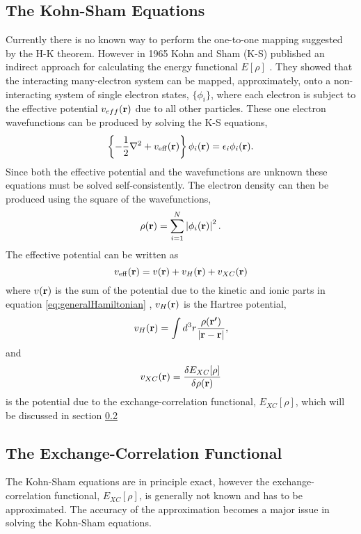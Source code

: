\subsection{The Kohn-Sham Equations}
Currently there is no known way to perform the one-to-one mapping suggested by the H-K theorem. However in 1965 Kohn and Sham (K-S) published an indirect approach for calculating the energy functional $E[\rho]$ \cite{kohn1965}.
They showed that the interacting many-electron system can be mapped, approximately, onto a non-interacting system of single electron states, $\{\phi_i\}$, where each electron is subject to the effective potential $v_{eff}({\mathrm{\mathbf{\bm{r}}}})$ due to all other particles. These one electron wavefunctions can be produced by solving the K-S equations,
\begin{equation}
\label{eq:K-Sequation}
 \left\{-\frac{1}{2} \nabla ^2 + v_\mathrm{eff}({\mathrm{\mathbf{\bm{r}}}}) \right\} \phi_i({\mathrm{\mathbf{\bm{r}}}}) = \epsilon_i \phi_i({\mathrm{\mathbf{\bm{r}}}}).
\end{equation}
Since both the effective potential and the wavefunctions are unknown these equations must be solved self-consistently.
The electron density can then be produced using the square of the wavefunctions,
\begin{equation}
\label{eq:electronDensity}
 \rho({\mathrm{\mathbf{\bm{r}}}}) = \sum_{i=1}^N \left| \phi_i({\mathrm{\mathbf{\bm{r}}}}) \right|^2.
\end{equation}
The effective potential can be written as
\begin{equation}
\label{eq:effectivePotential}
 v_\mathrm{eff}({\mathrm{\mathbf{\bm{r}}}}) = v({\mathrm{\mathbf{\bm{r}}}}) + v_{H}({\mathrm{\mathbf{\bm{r}}}}) + v_{XC}({\mathrm{\mathbf{\bm{r}}}})
\end{equation}
where $v({\mathrm{\mathbf{\bm{r}}}})$ is the sum of the potential due to the kinetic and ionic parts in equation \ref{eq:generalHamiltonian}%
, $v_{H}({\mathrm{\mathbf{\bm{r}}}})$ is the Hartree potential,
\begin{equation}
\label{eq:hartreePotential}
 v_{H}({\mathrm{\mathbf{\bm{r}}}}) = \int d^3r \frac{\rho({\mathrm{\mathbf{\bm{r'}}}})}{\left| {\mathrm{\mathbf{\bm{r}}}} - {\mathrm{\mathbf{\bm{r}}}} \right|},
\end{equation}
and
\begin{equation}
\label{eq:XCpotential}
 v_{XC}({\mathrm{\mathbf{\bm{r}}}}) = \frac{\delta E_{XC}[\rho]}{\delta \rho({\mathrm{\mathbf{\bm{r}}}})}
\end{equation}
is the potential due to the exchange-correlation functional, $E_{XC}[\rho]$, which will be discussed in section \ref{sec:XCfunctional} 

\subsection{The Exchange-Correlation Functional}
\label{sec:XCfunctional}
The Kohn-Sham equations are in principle exact, however the exchange-correlation functional, $E_{XC}[\rho]$, is generally not known and has to be approximated. The accuracy of the approximation becomes a major issue in solving the Kohn-Sham equations.

